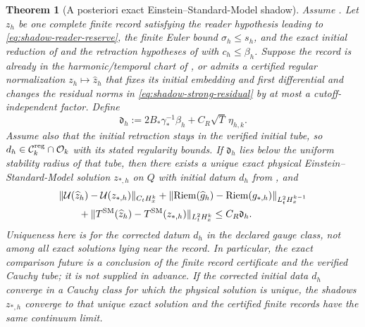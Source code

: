 \documentclass[11pt]{article}
\numberwithin{equation}{section}
\newtheorem{theorem}{Theorem}[section]
\theoremstyle{definition}
\theoremstyle{remark}
\newcommand{\Riem}{\operatorname{Riem}}
\newcommand{\norm}[1]{\lVert#1\rVert}
\begin{document}
\begin{theorem}[A posteriori exact Einstein--Standard-Model shadow]
\label{thm:aposteriori-physical-shadow}
Assume .  Let $z_h$ be one complete finite
record satisfying the reader hypothesis leading to
\eqref{eq:shadow-reader-reserve}, the finite Euler bound
$\sigma_h\le s_h$, and the exact initial reduction of  and the
retraction hypotheses of  with
$c_h\le\beta_h$.  Suppose the
record is already in the harmonic/temporal chart of
, or admits a certified regular normalization
$z_h\mapsto\widehat z_h$ that fixes its initial embedding and first
differential and changes the residual norms in
\eqref{eq:shadow-strong-residual} by at most a cutoff-independent factor.
Define
\begin{equation}
 \mathfrak d_h
 :=2B_*\gamma_*^{-1}\beta_h
   +C_R\sqrt T\,\eta_{h,k}.
 \label{eq:aposteriori-shadow-budget}
\end{equation}
Assume also that the initial retraction stays in the verified initial
tube, so $d_h\in\mathcal C_k^{\rm reg}\cap\mathcal O_k$ with its stated regularity
bounds.  If $\mathfrak d_h$ lies below the uniform stability radius of that
tube, then there exists a unique exact physical
Einstein--Standard-Model solution $z_{*,h}$ on $Q$ with initial datum $d_h$
from , and
\begin{align}
 &\norm{\mathcal U(\widehat z_h)-\mathcal U(z_{*,h})}_{C_tH_x^k}
 +\norm{\Riem(\widehat g_h)-\Riem(g_{*,h})}_{L_t^2H_x^{k-1}}
 \notag\\
 &\qquad
 +\norm{T^{\rm SM}(\widehat z_h)-T^{\rm SM}(z_{*,h})}_{L_t^2H_x^k}
 \le C_R\mathfrak d_h.
 \label{eq:aposteriori-physical-shadow}
\end{align}
Uniqueness here is for the corrected datum $d_h$ in the declared gauge
class, not among all exact solutions lying near the record. In particular,
the exact comparison future is a conclusion of the finite record certificate
and the verified Cauchy tube; it is not supplied in advance.  If the corrected initial
data $d_h$ converge in a Cauchy class for which the physical solution is
unique, the shadows $z_{*,h}$ converge to that unique exact solution and the
certified finite records have the same continuum limit.
\end{theorem}
\end{document}
